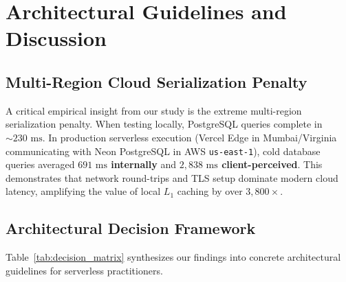 \documentclass[conference]{IEEEtran}
\begin{document}
\section{Architectural Guidelines and Discussion}

\subsection{Multi-Region Cloud Serialization Penalty}
A critical empirical insight from our study is the extreme multi-region serialization penalty. When testing locally, PostgreSQL queries complete in $\sim 230\text{ ms}$. In production serverless execution (Vercel Edge in Mumbai/Virginia communicating with Neon PostgreSQL in AWS \texttt{us-east-1}), cold database queries averaged \textbf{$691\text{ ms}$ internally} and \textbf{$2,838\text{ ms}$ client-perceived}. This demonstrates that network round-trips and TLS setup dominate modern cloud latency, amplifying the value of local $L_1$ caching by over $3,800\times$.

\subsection{Architectural Decision Framework}
Table~\ref{tab:decision_matrix} synthesizes our findings into concrete architectural guidelines for serverless practitioners.

\begin{table}[t]
\centering
\caption{Architectural Decision Framework for Serverless Practitioners}
\label{tab:decision_matrix}
\end{table}
\end{document}

